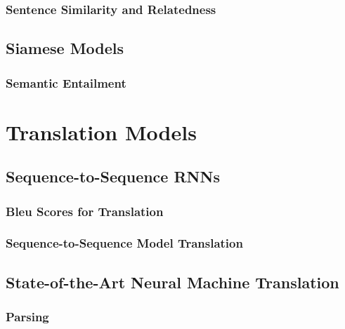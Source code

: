 			\subsubsection{Sentence Similarity and Relatedness} %

		\subsection{Siamese Models} %

			\subsubsection{Semantic Entailment} %

	\section{Translation Models} %

		\subsection{Sequence-to-Sequence RNNs} %

			\subsubsection{Bleu Scores for Translation} %

			\subsubsection{Sequence-to-Sequence Model Translation} %

		\subsection{State-of-the-Art Neural Machine Translation} %

			\subsubsection{Parsing} %

